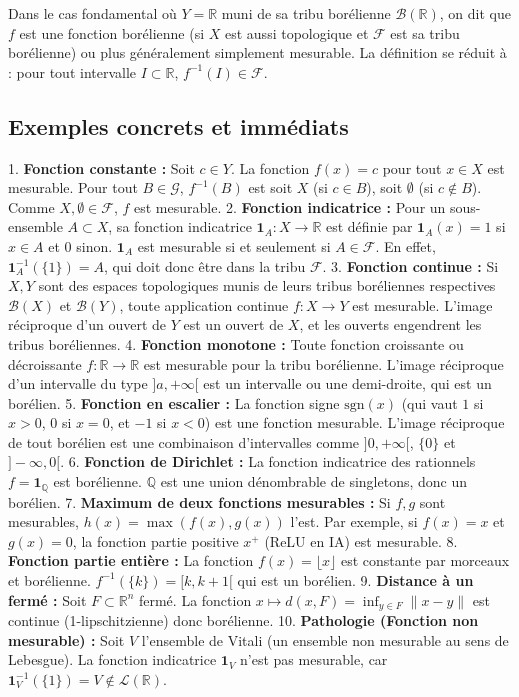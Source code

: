 \documentclass[11pt,a4paper]{article}
\begin{document}
Dans le cas fondamental où $Y = \mathbb{R}$ muni de sa tribu borélienne $\mathcal{B}(\mathbb{R})$, on dit que $f$ est une fonction borélienne (si $X$ est aussi topologique et $\mathcal{F}$ est sa tribu borélienne) ou plus généralement simplement mesurable. La définition se réduit à : pour tout intervalle $I \subset \mathbb{R}$, $f^{-1}(I) \in \mathcal{F}$.

\subsection*{Exemples concrets et immédiats}

1. \textbf{Fonction constante :} Soit $c \in Y$. La fonction $f(x) = c$ pour tout $x \in X$ est mesurable. Pour tout $B \in \mathcal{G}$, $f^{-1}(B)$ est soit $X$ (si $c \in B$), soit $\emptyset$ (si $c \notin B$). Comme $X, \emptyset \in \mathcal{F}$, $f$ est mesurable.
2. \textbf{Fonction indicatrice :} Pour un sous-ensemble $A \subset X$, sa fonction indicatrice $\mathbf{1}_A : X \to \mathbb{R}$ est définie par $\mathbf{1}_A(x) = 1$ si $x \in A$ et $0$ sinon. $\mathbf{1}_A$ est mesurable si et seulement si $A \in \mathcal{F}$. En effet, $\mathbf{1}_A^{-1}(\{1\}) = A$, qui doit donc être dans la tribu $\mathcal{F}$.
3. \textbf{Fonction continue :} Si $X, Y$ sont des espaces topologiques munis de leurs tribus boréliennes respectives $\mathcal{B}(X)$ et $\mathcal{B}(Y)$, toute application continue $f : X \to Y$ est mesurable. L'image réciproque d'un ouvert de $Y$ est un ouvert de $X$, et les ouverts engendrent les tribus boréliennes.
4. \textbf{Fonction monotone :} Toute fonction croissante ou décroissante $f : \mathbb{R} \to \mathbb{R}$ est mesurable pour la tribu borélienne. L'image réciproque d'un intervalle du type $]a, +\infty[$ est un intervalle ou une demi-droite, qui est un borélien.
5. \textbf{Fonction en escalier :} La fonction signe $\text{sgn}(x)$ (qui vaut $1$ si $x > 0$, $0$ si $x = 0$, et $-1$ si $x < 0$) est une fonction mesurable. L'image réciproque de tout borélien est une combinaison d'intervalles comme $]0, +\infty[$, $\{0\}$ et $]-\infty, 0[$.
6. \textbf{Fonction de Dirichlet :} La fonction indicatrice des rationnels $f = \mathbf{1}_{\mathbb{Q}}$ est borélienne. $\mathbb{Q}$ est une union dénombrable de singletons, donc un borélien.
7. \textbf{Maximum de deux fonctions mesurables :} Si $f, g$ sont mesurables, $h(x) = \max(f(x), g(x))$ l'est. Par exemple, si $f(x) = x$ et $g(x) = 0$, la fonction partie positive $x^+$ (ReLU en IA) est mesurable.
8. \textbf{Fonction partie entière :} La fonction $f(x) = \lfloor x \rfloor$ est constante par morceaux et borélienne. $f^{-1}(\{k\}) = [k, k+1[$ qui est un borélien.
9. \textbf{Distance à un fermé :} Soit $F \subset \mathbb{R}^n$ fermé. La fonction $x \mapsto d(x, F) = \inf_{y \in F} \|x - y\|$ est continue (1-lipschitzienne) donc borélienne.
10. \textbf{Pathologie (Fonction non mesurable) :} Soit $V$ l'ensemble de Vitali (un ensemble non mesurable au sens de Lebesgue). La fonction indicatrice $\mathbf{1}_V$ n'est pas mesurable, car $\mathbf{1}_V^{-1}(\{1\}) = V \notin \mathcal{L}(\mathbb{R})$.
\end{document}
